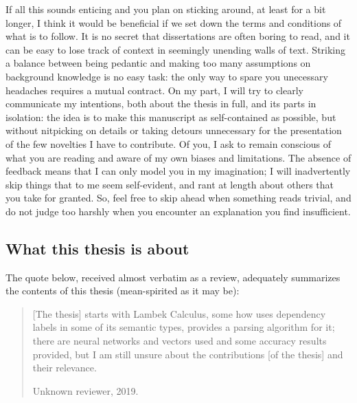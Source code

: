 If all this sounds enticing and you plan on sticking around, at least for a bit longer, I think it would be beneficial if we set down the terms and conditions of what is to follow. 
It is no secret that dissertations are often boring to read, and it can be easy to lose track of context in seemingly unending walls of text. 
Striking a balance between being pedantic and making too many assumptions on background knowledge is no easy task: the only way to spare you unecessary headaches requires a mutual contract. 
On my part, I will try to clearly communicate my intentions, both about the thesis in full, and its parts in isolation: the idea is to make this manuscript as self-contained as possible, but without nitpicking on details or taking detours unnecessary for the presentation of the few novelties I have to contribute.
Of you, I ask to remain conscious of what you are reading and aware of my own biases and limitations. 
The absence of feedback means that I can only model you in my imagination; 
I will inadvertently skip things that to me seem self-evident, and rant at length about others that you take for granted.
So, feel free to skip ahead when something reads trivial, and do not judge too harshly when you encounter an explanation you find insufficient.

\newpage

\subsection*{What this thesis is about}
The quote below, received almost verbatim as a review, adequately summarizes the contents of this thesis (mean-spirited as it may be):
\begin{quote}
[The thesis] starts with Lambek Calculus, some how uses dependency labels in some of its semantic types, provides a parsing algorithm for it; there are neural networks and vectors used and some accuracy results provided, but I am still unsure about the contributions [of the thesis] and their relevance.
\begin{flushright} Unknown reviewer, 2019.\end{flushright}
\end{quote}

